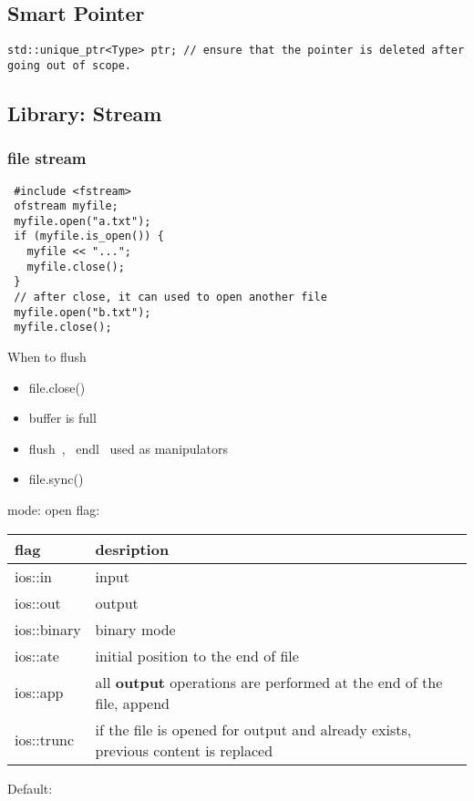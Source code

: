 \subsection{Smart Pointer}

\begin{lstlisting}
std::unique_ptr<Type> ptr; // ensure that the pointer is deleted after going out of scope.
\end{lstlisting}




\subsection{Library: Stream}
\subsubsection{file stream}

\begin{lstlisting}
 #include <fstream>
 ofstream myfile;
 myfile.open("a.txt");
 if (myfile.is_open()) {
   myfile << "...";
   myfile.close();
 }
 // after close, it can used to open another file
 myfile.open("b.txt");
 myfile.close();
\end{lstlisting}

When to flush
\begin{itemize}
\item file.close()
\item buffer is full
\item flush~, ~endl~ used as manipulators
\item file.sync()~
\end{itemize}

mode: open flag:

\begin{tabular}{ll}
  flag & desription\\
  \hline
  ios::in & input\\
  ios::out & output\\
  ios::binary & binary mode\\
  ios::ate & initial position to the end of file\\
  ios::app & all \textbf{\textbf{output}} operations are performed at the end of the file, append\\
  ios::trunc & if the file is opened for output and already exists, previous content is replaced\\
\end{tabular}

Default:

